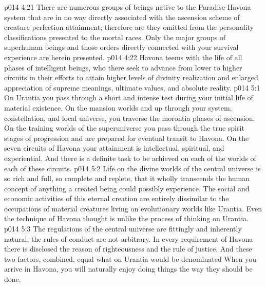 \vs p014 4:21 There are numerous groups of beings native to the Paradise\hyp{}Havona system that are in no way directly associated with the ascension scheme of creature perfection attainment; therefore are they omitted from the personality classifications presented to the mortal races. Only the major groups of superhuman beings and those orders directly connected with your survival experience are herein presented.
\vs p014 4:22 Havona teems with the life of all phases of intelligent beings, who there seek to advance from lower to higher circuits in their efforts to attain higher levels of divinity realization and enlarged appreciation of supreme meanings, ultimate values, and absolute reality.
\vs p014 5:1 On Urantia you pass through a short and intense test during your initial life of material existence. On the mansion worlds and up through your system, constellation, and local universe, you traverse the morontia phases of ascension. On the training worlds of the superuniverse you pass through the true spirit stages of progression and are prepared for eventual transit to Havona. On the seven circuits of Havona your attainment is intellectual, spiritual, and experiential. And there is a definite task to be achieved on each of the worlds of each of these circuits.
\vs p014 5:2 Life on the divine worlds of the central universe is so rich and full, so complete and replete, that it wholly transcends the human concept of anything a created being could possibly experience. The social and economic activities of this eternal creation are entirely dissimilar to the occupations of material creatures living on evolutionary worlds like Urantia. Even the technique of Havona thought is unlike the process of thinking on Urantia.
\vs p014 5:3 The regulations of the central universe are fittingly and inherently natural; the rules of conduct are not arbitrary. In every requirement of Havona there is disclosed the reason of righteousness and the rule of justice. And these two factors, combined, equal what on Urantia would be denominated  When you arrive in Havona, you will naturally enjoy doing things the way they should be done.

